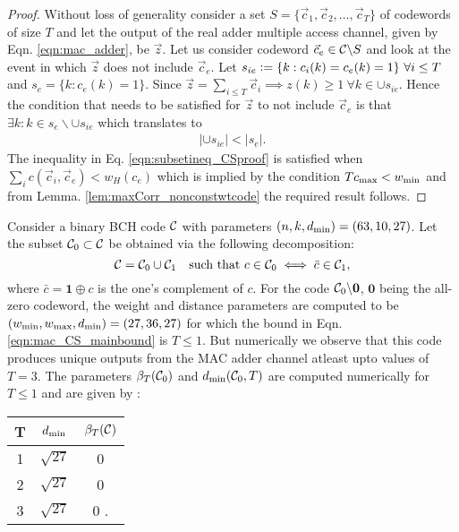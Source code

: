 \begin{proof}
Without loss of generality consider a set $S=\{\vec{c}_1,\vec{c}_2,\ldots, \vec{c}_T\}$ of codewords of size $T$ and let the output of the real adder multiple access channel, given by Eqn. \eqref{eqn:mac_adder}, be $\vec{z}$. Let us consider codeword $\vec{c}_e\in\mathcal{C}\backslash S$ and look at the event in which $\vec{z}$ does not include $\vec{c}_e$. Let $s_{ie}\mathrel{\mathop:}=\{k:c_{i}(k)=c_{e}(k)=1\}~\forall i\leq T$ and  $s_{e}=\{k: c_{e}(k)=1\}$. Since $\vec{z}=\sum_{i\leq T}\vec{c}_i\implies z(k)\geq 1 ~\forall k\in \cup s_{ie}$. Hence the condition that needs to be satisfied for $\vec{z}$ to not include $\vec{c}_e$ is that $\exists k: k\in s_e\backslash \cup s_{ie}$ which translates to
\begin{align}
 |\cup s_{ie}|< |s_e|.\label{eqn:subsetineq_CSproof}
\end{align}
The inequality in Eq. \eqref{eqn:subsetineq_CSproof} is satisfied when $\sum_i c(\vec{c}_i,\vec{c}_e)<w_H(c_e)$ which is implied by the condition $Tc_{\max}<w_{\text{min}}$ and from Lemma. \ref{lem:maxCorr_nonconstwtcode} the required result follows.
\end{proof}


\begin{example}
Consider a binary BCH code $\mathcal{C}$ with parameters $(n,k,d_{\mathrm{min}})=(63,10,27)$. Let the subset $\mathcal{C}_0\subset \mathcal{C}$ be obtained via the following decomposition:
\[
\mathcal{C}=\mathcal{C}_0 \cup \mathcal{C}_1 ~~\text{ such that } c\in \mathcal{C}_0 \iff \bar{c}\in\mathcal{C}_1,
\]
where $\bar{c}=\mathbf{1}\oplus c$ is the one's complement of $c$. For the code $\mathcal{C}_0\backslash \mathbf{0}$, $\mathbf{0}$ being the all-zero codeword, the weight and distance parameters are computed to be $(w_{\text{min}},w_{\text{max}},d_{\mathrm{min}})=(27,36,27)$ for which the bound in Eqn. \eqref{eqn:mac_CS_mainbound} is $T\leq 1$. But numerically we observe that this code produces unique outputs from the MAC adder channel atleast upto values of $T=3$. The parameters $\beta_T(\mathcal{C}_0)$ and $d_{\mathrm{min}}(\mathcal{C}_0,T)$ are computed numerically for $T\leq 1$ and are given by :
\begin{center}
\begin{tabular}{ c c c }
T  &  $d_{\mathrm{min}}$& $\beta_T(\mathcal{C})$\\
\hline\hline
1	&	$\sqrt{27}$	& 0\\
2	& $\sqrt{27}$ & 0\\
3  &  $\sqrt{27}$& 0 .
\end{tabular}
\end{center}
\label{Ex:BCH_halfcode}
\end{example}

